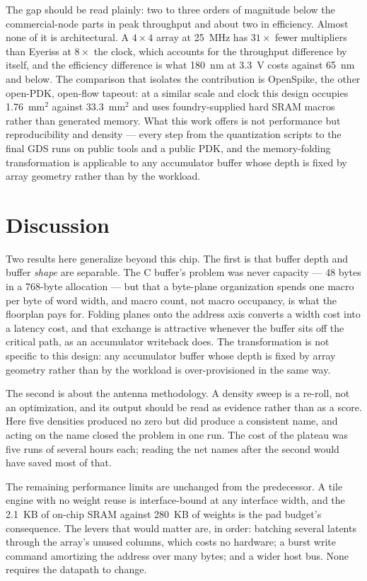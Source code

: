 \documentclass[conference,a4paper]{APSIPA2026}
\begin{document}
The gap should be read plainly: two to three orders of magnitude below the commercial-node parts in peak throughput and about two in efficiency. Almost none of it is architectural. A $4\times4$ array at 25~MHz has $31\times$ fewer multipliers than Eyeriss at $8\times$ the clock, which accounts for the throughput difference by itself, and the efficiency difference is what 180~nm at 3.3~V costs against 65~nm and below. The comparison that isolates the contribution is OpenSpike, the other open-PDK, open-flow tapeout: at a similar scale and clock this design occupies 1.76~mm$^2$ against 33.3~mm$^2$ and uses foundry-supplied hard SRAM macros rather than generated memory. What this work offers is not performance but reproducibility and density --- every step from the quantization scripts to the final GDS runs on public tools and a public PDK, and the memory-folding transformation is applicable to any accumulator buffer whose depth is fixed by array geometry rather than by the workload.

\section{Discussion}\label{sec:disc}
Two results here generalize beyond this chip. The first is that buffer depth and buffer \emph{shape} are separable. The C buffer's problem was never capacity --- 48 bytes in a 768-byte allocation --- but that a byte-plane organization spends one macro per byte of word width, and macro count, not macro occupancy, is what the floorplan pays for. Folding planes onto the address axis converts a width cost into a latency cost, and that exchange is attractive whenever the buffer sits off the critical path, as an accumulator writeback does. The transformation is not specific to this design: any accumulator buffer whose depth is fixed by array geometry rather than by the workload is over-provisioned in the same way.

The second is about the antenna methodology. A density sweep is a re-roll, not an optimization, and its output should be read as evidence rather than as a score. Here five densities produced no zero but did produce a consistent name, and acting on the name closed the problem in one run. The cost of the plateau was five runs of several hours each; reading the net names after the second would have saved most of that.

The remaining performance limits are unchanged from the predecessor. A tile engine with no weight reuse is interface-bound at any interface width, and the 2.1~KB of on-chip SRAM against 280~KB of weights is the pad budget's consequence. The levers that would matter are, in order: batching several latents through the array's unused columns, which costs no hardware; a burst write command amortizing the address over many bytes; and a wider host bus. None requires the datapath to change.
\end{document}
